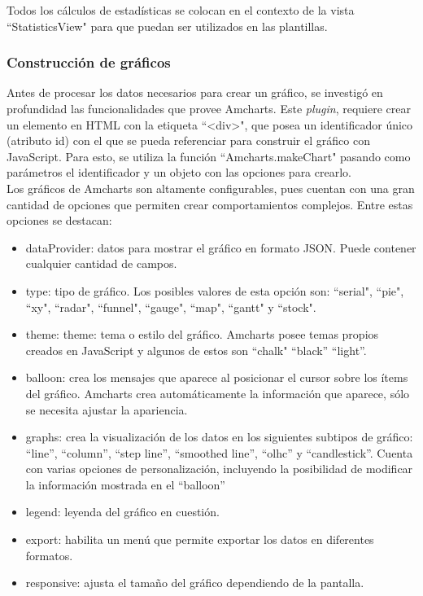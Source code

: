 Todos los cálculos de estadísticas se colocan en el contexto de la vista “StatisticsView" para que puedan ser utilizados en las plantillas.

\subsubsection{Construcción de gráficos}

Antes de procesar los datos necesarios para crear un gráfico, se investigó en profundidad las funcionalidades que provee Amcharts. Este \textit{plugin}, requiere crear un elemento en HTML con la etiqueta “<div>", que posea un identificador único (atributo id) con el que se pueda referenciar para construir el gráfico con JavaScript. Para esto, se utiliza la función “Amcharts.makeChart" pasando como parámetros el identificador y un objeto con las opciones para crearlo.\\

Los gráficos de Amcharts son altamente configurables, pues cuentan con una gran cantidad de opciones que permiten crear comportamientos complejos. Entre estas opciones se destacan:

\begin{itemize}
    \item dataProvider: datos para mostrar el gráfico en formato JSON. Puede contener cualquier cantidad de campos.
    \item type: tipo de gráfico. Los posibles valores de esta opción son: “serial", “pie", “xy", “radar", “funnel", “gauge", “map", “gantt" y “stock".
    \item theme: theme: tema o estilo del gráfico. Amcharts posee temas propios creados en JavaScript y algunos de estos son “chalk" “black” “light”.
    \item balloon: crea los mensajes que aparece al posicionar el cursor sobre los ítems del gráfico. Amcharts crea automáticamente la información que aparece, sólo se necesita ajustar la apariencia.
    \item graphs: crea la visualización de los datos en los siguientes subtipos de gráfico: “line”, “column”, “step line”, “smoothed line”, “olhc” y “candlestick”. Cuenta con varias opciones de personalización, incluyendo la posibilidad de modificar la información mostrada en el “balloon”
    \item legend: leyenda del gráfico en cuestión.
    \item export: habilita un menú que permite exportar los datos en diferentes formatos.
    \item responsive: ajusta el tamaño del gráfico dependiendo de la pantalla.
\end{itemize}


